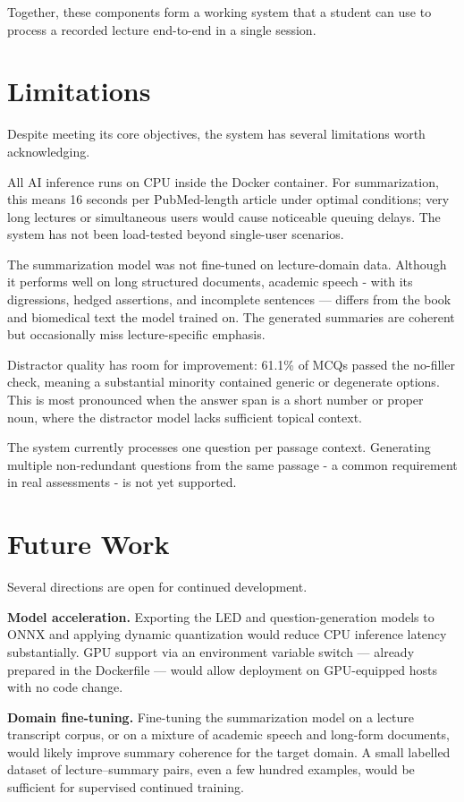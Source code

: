 Together, these components form a working system that a student can use to process a recorded lecture end-to-end in a single session.

\section{Limitations}

Despite meeting its core objectives, the system has several limitations worth acknowledging.

All AI inference runs on CPU inside the Docker container. For summarization, this means 16 seconds per PubMed-length article under optimal conditions; very long lectures or simultaneous users would cause noticeable queuing delays. The system has not been load-tested beyond single-user scenarios.

The summarization model was not fine-tuned on lecture-domain data. Although it performs well on long structured documents, academic speech - with its digressions, hedged assertions, and incomplete sentences — differs from the book and biomedical text the model trained on. The generated summaries are coherent but occasionally miss lecture-specific emphasis.

Distractor quality has room for improvement: 61.1\% of MCQs passed the no-filler check, meaning a substantial minority contained generic or degenerate options. This is most pronounced when the answer span is a short number or proper noun, where the distractor model lacks sufficient topical context.

The system currently processes one question per passage context. Generating multiple non-redundant questions from the same passage - a common requirement in real assessments - is not yet supported.

\section{Future Work}

Several directions are open for continued development.

\textbf{Model acceleration.} Exporting the LED and question-generation models to ONNX and applying dynamic quantization would reduce CPU inference latency substantially. GPU support via an environment variable switch — already prepared in the Dockerfile — would allow deployment on GPU-equipped hosts with no code change.

\textbf{Domain fine-tuning.} Fine-tuning the summarization model on a lecture transcript corpus, or on a mixture of academic speech and long-form documents, would likely improve summary coherence for the target domain. A small labelled dataset of lecture–summary pairs, even a few hundred examples, would be sufficient for supervised continued training.

